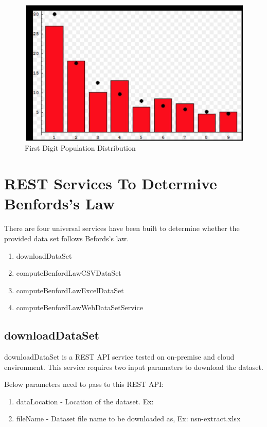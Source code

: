 \begin{figure}[!ht]
\centering\includegraphics[width=\columnwidth]{images/benford_country.JPG}
  \caption{First Digit Population Distribution}\label{f:pop-dist-countries}
\end{figure}

\section{REST Services To Determive Benfords's Law}

There are four universal services have been built to determine
whether the provided data set follows Befords's law.

\begin{enumerate}
 \item downloadDataSet
 \item computeBenfordLawCSVDataSet
 \item computeBenfordLawExcelDataSet
 \item computeBenfordLawWebDataSetService
\end{enumerate}


\subsection{downloadDataSet}
downloadDataSet is a REST API service tested on 
on-premise and cloud environment. This service requires two 
input paramaters to download the dataset.

Below parameters need to pass to this REST API:

\begin{enumerate}
\item dataLocation - Location of the dataset. 
 Ex:~\cite{hid-sp18-514-excelDatalocation}
\item fileName - Dataset file name to be downloaded 
 as, Ex: nsn-extract.xlsx
\end{enumerate}


